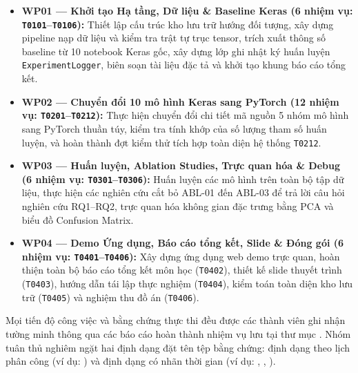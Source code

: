 \begin{itemize}
\item \textbf{WP01 — Khởi tạo Hạ tầng, Dữ liệu \& Baseline Keras (6 nhiệm vụ: \texttt{T0101}--\texttt{T0106}):} Thiết lập cấu trúc kho lưu trữ hướng đối tượng, xây dựng pipeline nạp dữ liệu và kiểm tra trật tự trục tensor, trích xuất thông số baseline từ 10 notebook Keras gốc, xây dựng lớp ghi nhật ký huấn luyện \texttt{ExperimentLogger}, biên soạn tài liệu đặc tả và khởi tạo khung báo cáo tổng kết.
\item \textbf{WP02 — Chuyển đổi 10 mô hình Keras sang PyTorch (12 nhiệm vụ: \texttt{T0201}--\texttt{T0212}):} Thực hiện chuyển đổi chi tiết mã nguồn 5 nhóm mô hình sang PyTorch thuần túy, kiểm tra tính khớp của số lượng tham số huấn luyện, và hoàn thành đợt kiểm thử tích hợp toàn diện hệ thống \texttt{T0212}.
\item \textbf{WP03 — Huấn luyện, Ablation Studies, Trực quan hóa \& Debug (6 nhiệm vụ: \texttt{T0301}--\texttt{T0306}):} Huấn luyện các mô hình trên toàn bộ tập dữ liệu, thực hiện các nghiên cứu cắt bỏ ABL-01 đến ABL-03 để trả lời câu hỏi nghiên cứu RQ1--RQ2, trực quan hóa không gian đặc trưng bằng PCA và biểu đồ Confusion Matrix.
\item \textbf{WP04 — Demo Ứng dụng, Báo cáo tổng kết, Slide \& Đóng gói (6 nhiệm vụ: \texttt{T0401}--\texttt{T0406}):} Xây dựng ứng dụng web demo trực quan, hoàn thiện toàn bộ báo cáo tổng kết môn học (\texttt{T0402}), thiết kế slide thuyết trình (\texttt{T0403}), hướng dẫn tái lập thực nghiệm (\texttt{T0404}), kiểm toán toàn diện kho lưu trữ (\texttt{T0405}) và nghiệm thu đồ án (\texttt{T0406}).
\end{itemize}

Mọi tiến độ công việc và bằng chứng thực thi đều được các thành viên ghi nhận tường minh thông qua các báo cáo hoàn thành nhiệm vụ lưu tại thư mục . Nhóm tuân thủ nghiêm ngặt hai định dạng đặt tên tệp bằng chứng: định dạng theo lịch phân công  (ví dụ: ) và định dạng có nhãn thời gian  (ví dụ: , , ).

